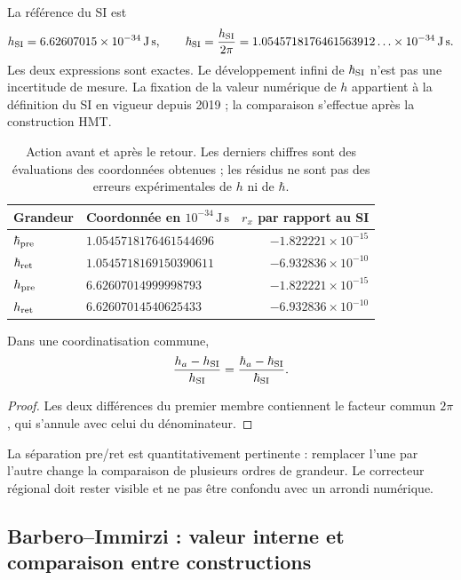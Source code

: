 La référence du SI est
\[
 h_{\rm SI}=6.62607015\times10^{-34}\,\mathrm{J\,s},\qquad
 \hbar_{\rm SI}=\frac{h_{\rm SI}}{2\pi}
 =1.0545718176461563912\ldots\times10^{-34}\,\mathrm{J\,s}.
\]
Les deux expressions sont exactes. Le développement infini de \(\hbar_{\rm SI}\)
n’est pas une incertitude de mesure. La fixation de la valeur numérique de
\(h\) appartient à la définition du SI en vigueur depuis 2019
\cite{bipm2018} ; la comparaison s’effectue après la construction HMT.

\begin{table}[htbp]
\centering\small
\setlength{\tabcolsep}{5pt}
\begin{tabular}{@{}llr@{}}
\toprule
Grandeur & Coordonnée en \(10^{-34}\,\mathrm{J\,s}\) & \(r_x\) par rapport au SI\\
\midrule
\(\hbar_{\rm pre}\) & \(1.0545718176461544696\) & \(-1.822221\times10^{-15}\)\\
\(\hbar_{\rm ret}\) & \(1.0545718169150390611\) & \(-6.932836\times10^{-10}\)\\
\(h_{\rm pre}\) & \(6.62607014999998793\) & \(-1.822221\times10^{-15}\)\\
\(h_{\rm ret}\) & \(6.62607014540625433\) & \(-6.932836\times10^{-10}\)\\
\bottomrule
\end{tabular}
\caption{Action avant et après le retour. Les derniers chiffres sont
des évaluations des coordonnées obtenues ; les résidus ne sont pas des erreurs
expérimentales de \(h\) ni de \(\hbar\).}
\label{tab:ii-planck-comparacion}
\end{table}

\begin{proposition}
Dans une coordinatisation commune,
\[
 \frac{h_a-h_{\rm SI}}{h_{\rm SI}}
 =\frac{\hbar_a-\hbar_{\rm SI}}{\hbar_{\rm SI}}.
\]
\end{proposition}
\begin{proof}
Les deux différences du premier membre contiennent le facteur commun
\(2\pi\), qui s’annule avec celui du dénominateur.
\end{proof}
La séparation pre/ret est quantitativement pertinente : remplacer l’une par
l’autre change la comparaison de plusieurs ordres de grandeur. Le correcteur
régional doit rester visible et ne pas être confondu avec un arrondi numérique.

\subsection{Barbero--Immirzi : valeur interne et comparaison entre constructions}

